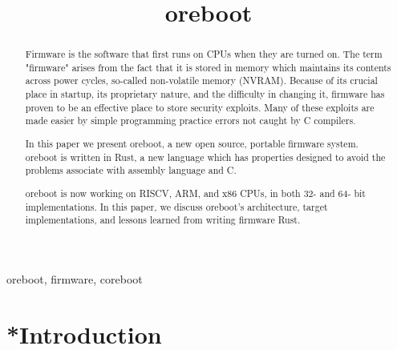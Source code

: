 \documentclass[conference]{IEEEtran}
\begin{document}
\title{oreboot}

\author{
\and
{}

}

\maketitle

\begin{abstract}
Firmware is the software that first runs on CPUs when they are turned on. 
The term "firmware" arises from the fact that it is stored in memory which maintains
its contents across power cycles, so-called non-volatile memory (NVRAM). 
Because of its crucial place in startup, its proprietary nature, and the difficulty in changing it, firmware has proven to be an effective place to store security exploits\cite{cui2013firmware}. Many of these exploits are made easier
by simple programming practice errors not caught by C compilers\cite{wojtczuk2015attacks}.

In this paper we present oreboot, a new open source, portable firmware system. 
oreboot is written in Rust\cite{balasubramanian2017system}, a new language which 
has properties designed to avoid the problems associate with assembly language and C.

oreboot is now working on RISCV, ARM, and x86 CPUs, in both 32- and 64- bit implementations. In this paper, we discuss oreboot's architecture, target implementations,
and lessons learned from writing firmware Rust. 


\end{abstract}

\begin{IEEEkeywords}
oreboot, firmware, coreboot
\end{IEEEkeywords}

\section{*Introduction}
\end{document}
